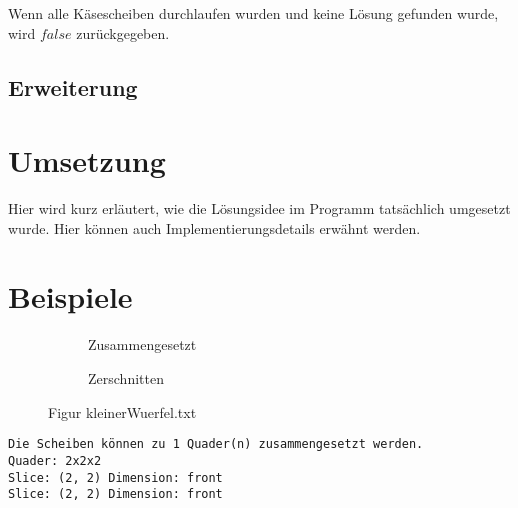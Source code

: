 \documentclass[a4paper,10pt,ngerman]{scrartcl}
\newcommand{\simplecube}[8]%
{
    \begin{scope}[shift={#1}]
        \fill[gray!40,canvas is yz plane at x=#2, opacity=#8] (0,0) rectangle (#3,#4);
        \fill[gray!10,canvas is xz plane at y=#3, opacity=#8] (0,0) rectangle (#2,#4);
        \fill[white  ,canvas is xy plane at z=#4, opacity=#8] (0,0) rectangle (#2,#3);
        \foreach\i/\j in {0/1, 1/1, 1/0}
            {
            \draw[line#5] (0,#3*\i,#4*\j) --++ (#2,0,0);
            \draw[line#6] (#2*\i,0,#4*\j) --++ (0,#3,0);
            \draw[line#7] (#2*\i,#3*\j,0) --++ (0,0,#4);
        }
    \end{scope}
}
\newcommand{\smallSquare}[4]%
{
    \begin{scope}[shift={#1}]
        \simplecube{(0,     0,      0)}     {1}{2}{2}   {a}{a}{a}   {1}
        \simplecube{(1+#4,   0,      0))}    {1}{2}{2}   {a}{a}{a}   {1}
    \end{scope}
}
\begin{document}
    Wenn alle Käsescheiben durchlaufen wurden und keine Lösung gefunden wurde, wird $false$ zurückgegeben.

    \subsection{Erweiterung}\label{subsec:erweiterung_losungsidee}

    \newpage
    \section{Umsetzung}\label{sec:umsetzung}
    Hier wird kurz erläutert, wie die Lösungsidee im Programm tatsächlich umgesetzt wurde.
    Hier können auch Implementierungsdetails erwähnt werden.


    \newpage
    \section{Beispiele}\label{sec:beispiele}

    \begin{figure}[H]
        \centering
        \def\a{3.2}
        \def\b{1.2}
        \begin{subfigure}[b]{0.45\textwidth}
            \centering %
            \caption{Zusammengesetzt}\label{fig:figA2}
        \end{subfigure}
        \begin{subfigure}[b]{0.45\textwidth}
            \centering %
            \caption{Zerschnitten}\label{fig:figB2}
        \end{subfigure}
        \caption{Figur kleinerWuerfel.txt}\label{fig:figAB2}
    \end{figure}

    \begin{lstlisting}[frame=single, title=Programmausgabe kleinerWuerfel.txt, breaklines=true,label={lst:lstlisting2}]
    Die Scheiben können zu 1 Quader(n) zusammengesetzt werden.
Quader: 2x2x2
Slice: (2, 2) Dimension: front
Slice: (2, 2) Dimension: front
    \end{lstlisting}
\end{document}
